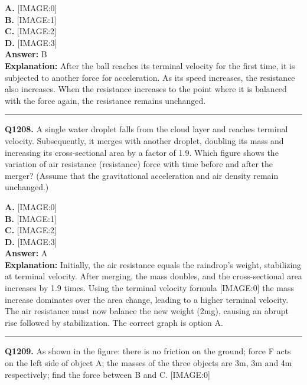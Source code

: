 \documentclass[12pt]{article}
\begin{document}
\textbf{A.} [IMAGE:0] \\
\textbf{B.} [IMAGE:1] \\
\textbf{C.} [IMAGE:2] \\
\textbf{D.} [IMAGE:3] \\

\textbf{Answer:} B \\
\textbf{Explanation:} After the ball reaches its terminal velocity for the first time, it is subjected to another force for acceleration. As its speed increases, the resistance also increases. When the resistance increases to the point where it is balanced with the force again, the resistance remains unchanged.

\hrule
\vspace{1em}


\noindent
\textbf{Q1208.} A single water droplet falls from the cloud layer and reaches terminal velocity. Subsequently, it merges with another droplet, doubling its mass and increasing its cross-sectional area by a factor of 1.9. Which figure shows the variation of air resistance (resistance) force with time before and after the merger? (Assume that the gravitational acceleration and air density remain unchanged.)



\textbf{A.} [IMAGE:0] \\
\textbf{B.} [IMAGE:1] \\
\textbf{C.} [IMAGE:2] \\
\textbf{D.} [IMAGE:3] \\

\textbf{Answer:} A \\
\textbf{Explanation:} Initially, the air resistance equals the raindrop’s weight, stabilizing at terminal velocity. After merging, the mass doubles, and the cross-sectional area increases by 1.9 times. Using the terminal velocity formula
[IMAGE:0]
the mass increase dominates over the area change, leading to a higher terminal velocity. The air resistance must now balance the new weight (2mg), causing an abrupt rise followed by stabilization. The correct graph is option A.

\hrule
\vspace{1em}


\noindent
\textbf{Q1209.} As shown in the figure: there is no friction on the ground; force F acts on the left side of object A; the masses of the three objects are 3m, 3m and 4m respectively; find the force between B and C.
[IMAGE:0]
\end{document}
